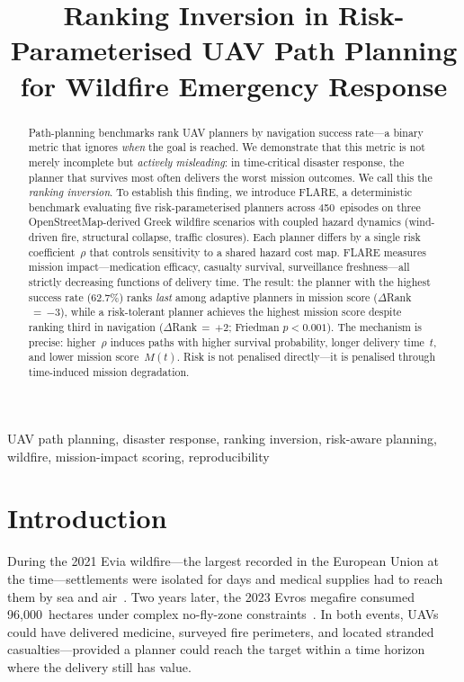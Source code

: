 \documentclass[conference]{IEEEtran}
\title{Ranking Inversion in Risk-Parameterised UAV Path Planning\\
       for Wildfire Emergency Response}
\author{%
  \IEEEauthorblockN{Konstantinos~Zervakis\IEEEauthorrefmark{1}
    \and Elias~Panagiotopoulos\IEEEauthorrefmark{1}}
  \IEEEauthorblockA{\IEEEauthorrefmark{1}Athens, Greece}
}
\begin{document}
\maketitle

\begin{abstract}
Path-planning benchmarks rank UAV planners by navigation success rate---a
binary metric that ignores \emph{when} the goal is reached. We demonstrate
that this metric is not merely incomplete but \emph{actively misleading}:
in time-critical disaster response, the planner that survives most often
delivers the worst mission outcomes. We call this the \emph{ranking
inversion}. To establish this finding, we introduce FLARE, a deterministic
benchmark evaluating five risk-parameterised planners across
450~episodes on three OpenStreetMap-derived Greek wildfire scenarios with
coupled hazard dynamics (wind-driven fire, structural collapse, traffic
closures). Each planner differs by a single risk coefficient~$\rho$ that
controls sensitivity to a shared hazard cost map. FLARE measures mission
impact---medication efficacy, casualty survival, surveillance
freshness---all strictly decreasing functions of delivery time. The result:
the planner with the highest success rate (62.7\%) ranks \emph{last} among
adaptive planners in mission score ($\Delta$Rank$\,{=}\,{-3}$), while a
risk-tolerant planner achieves the highest mission score despite ranking
third in navigation ($\Delta$Rank$\,{=}\,{+2}$; Friedman $p < 0.001$).
The mechanism is precise: higher~$\rho$ induces paths with higher survival probability, longer
delivery time~$t$, and lower mission score~$M(t)$. Risk is not penalised directly---it is
penalised through time-induced mission degradation.
\end{abstract}

\begin{IEEEkeywords}
UAV path planning, disaster response, ranking inversion, risk-aware
planning, wildfire, mission-impact scoring, reproducibility
\end{IEEEkeywords}

\section{Introduction}\label{sec:intro}

During the 2021 Evia wildfire---the largest recorded in the European Union
at the time---settlements were isolated for days and medical supplies had to
reach them by sea and air~\cite{Erdelj2017,Rahim2025}. Two years later, the
2023 Evros megafire consumed 96{,}000~hectares under complex no-fly-zone
constraints~\cite{copernicus_emsn166,effis2023}. In both events, UAVs could
have delivered medicine, surveyed fire perimeters, and located stranded
casualties---provided a planner could reach the target within a time horizon where
the delivery still has value.
\end{document}
